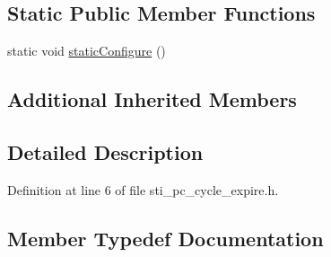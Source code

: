 \subsection*{Static Public Member Functions}
\begin{DoxyCompactItemize}
\item 
static void \hyperlink{structsm__respira__1_1_1pc__cycle__inner__states_1_1StiPCCycleExpire_a709afc5dd10c05efdd7bfe3f10de1e1d}{static\+Configure} ()
\end{DoxyCompactItemize}
\subsection*{Additional Inherited Members}


\subsection{Detailed Description}


Definition at line 6 of file sti\+\_\+pc\+\_\+cycle\+\_\+expire.\+h.



\subsection{Member Typedef Documentation}
\mbox{\label{structsm__respira__1_1_1pc__cycle__inner__states_1_1StiPCCycleExpire_ae08aad9407ec76716ef92383f184df67}} 
